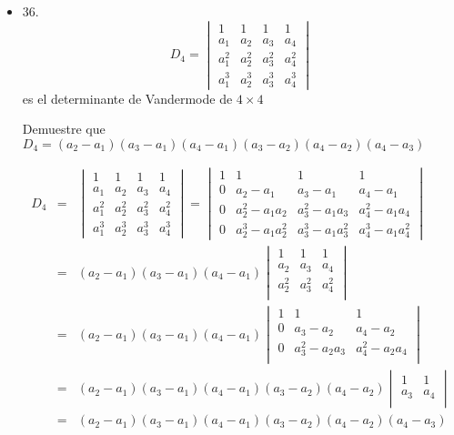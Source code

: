 \documentclass[12pt]{article}
\theoremstyle{plain}
\theoremstyle{definition}
\begin{document}
\begin{itemize}
    \item 36. \[D_4=\begin{vmatrix}
    1&1&1&1\\
    a_1& a_2 & a_3 &a_4\\
    a_1^2& a_2^2 & a_3^2 &a_4^2\\
    a_1^3& a_2^3 & a_3^3 &a_4^3
    \end{vmatrix}
    \] es el determinante de Vandermode de $4\times 4$
    
    Demuestre que $D_4=(a_2-a_1)(a_3-a_1)(a_4-a_1)(a_3-a_2)(a_4-a_2)(a_4-a_3)$
    
    \begin{eqnarray*}
    D_4&=&\begin{vmatrix}
    1&1&1&1\\
    a_1& a_2 & a_3 &a_4\\
    a_1^2& a_2^2 & a_3^2 &a_4^2\\
    a_1^3& a_2^3 & a_3^3 &a_4^3
    \end{vmatrix}=\begin{vmatrix}
    1&1&1&1\\
    0& a_2-a_1 & a_3-a_1 &a_4-a_1\\
    0& a_2^2-a_1a_2 & a_3^2-a_1a_3 &a_4^2-a_1a_4\\
    0& a_2^3 -a_1a_2^2& a_3^3-a_1a_3^2 &a_4^3-a_1a_4^2
    \end{vmatrix}\\
    &=&(a_2-a_1)(a_3-a_1)(a_4-a_1)\begin{vmatrix}
    1&1&1\\
     a_2 & a_3 &a_4\\
     a_2^2 & a_3^2 &a_4^2\\
    \end{vmatrix}\\
    &=&(a_2-a_1)(a_3-a_1)(a_4-a_1)\begin{vmatrix}
    1&1&1\\
     0& a_3-a_2 &a_4-a_2\\
     0& a_3^2-a_2a_3 &a_4^2-a_2a_4\\
    \end{vmatrix}\\
    &=&(a_2-a_1)(a_3-a_1)(a_4-a_1)(a_3-a_2)(a_4-a_2)\begin{vmatrix}
    1&1\\
     a_3 &a_4\\
    \end{vmatrix}\\
    &=&(a_2-a_1)(a_3-a_1)(a_4-a_1)(a_3-a_2)(a_4-a_2)(a_4-a_3)
    \end{eqnarray*}
    

\end{itemize}
\end{document}
